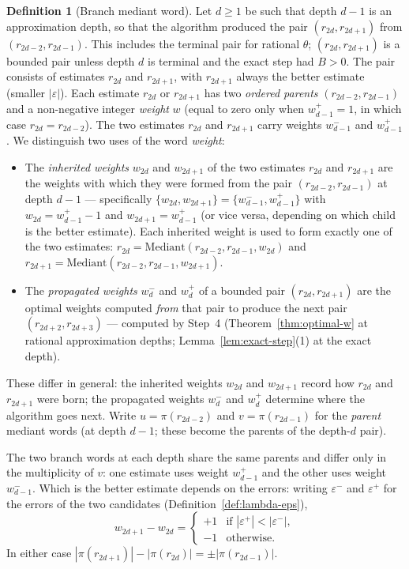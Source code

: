 \documentclass[12pt]{article}
\theoremstyle{definition}
\newtheorem{definition}[theorem]{Definition}
\theoremstyle{remark}
\theoremstyle{plain}
\newcommand{\eps}{\varepsilon}
\newcommand{\epsplus}{\eps^{+}}
\newcommand{\epsminus}{\eps^{-}}
\begin{document}
\begin{definition}[Branch mediant word]
\label{def:parity-sequence}
Let $d \geq 1$ be such that depth $d-1$ is an approximation depth, so that the algorithm produced the
pair $(r_{2d}, r_{2d+1})$ from $(r_{2d-2}, r_{2d-1})$.
This includes the terminal pair for rational $\theta$; $(r_{2d}, r_{2d+1})$ is a bounded
pair unless depth $d$ is terminal and the exact step had $B > 0$.
The pair consists of estimates $r_{2d}$ and $r_{2d+1}$,
with $r_{2d+1}$ always the better estimate (smaller $|\eps|$).
Each estimate $r_{2d}$ or $r_{2d+1}$ has two \emph{ordered parents}
$(r_{2d-2}, r_{2d-1})$ and a non-negative integer \emph{weight} $w$
(equal to zero only when $w^+_{d-1} = 1$, in which case $r_{2d} = r_{2d-2}$).
The two estimates $r_{2d}$ and $r_{2d+1}$ carry weights $w^-_{d-1}$ and $w^+_{d-1}$.
We distinguish two uses of the word \emph{weight}:
\begin{itemize}
  \item The \emph{inherited weights} $w_{2d}$ and $w_{2d+1}$ of the two estimates
        $r_{2d}$ and $r_{2d+1}$ are the weights with which they were formed from
        the pair $(r_{2d-2}, r_{2d-1})$ at depth $d-1$ --- specifically
        $\{w_{2d}, w_{2d+1}\} = \{w^-_{d-1}, w^+_{d-1}\}$ with $w_{2d} = w^+_{d-1} - 1$
        and $w_{2d+1} = w^+_{d-1}$ (or vice versa, depending on which child is the better
        estimate). Each inherited weight is used to form exactly one of the two
        estimates: $r_{2d} = \mathrm{Mediant}(r_{2d-2}, r_{2d-1}, w_{2d})$ and
        $r_{2d+1} = \mathrm{Mediant}(r_{2d-2}, r_{2d-1}, w_{2d+1})$.
  \item The \emph{propagated weights} $w^-_d$ and $w^+_d$ of a bounded pair $(r_{2d}, r_{2d+1})$
        are the optimal weights computed \emph{from} that pair to produce the next
        pair $(r_{2d+2}, r_{2d+3})$ --- computed by Step~4
        (Theorem~\ref{thm:optimal-w} at rational approximation depths; Lemma~\ref{lem:exact-step}(1)
        at the exact depth).
\end{itemize}
These differ in general: the inherited weights $w_{2d}$ and $w_{2d+1}$ record how $r_{2d}$ and $r_{2d+1}$ were born;
the propagated weights $w^-_d$ and $w^+_d$ determine where the algorithm goes next.
Write $u = \pi(r_{2d-2})$ and $v = \pi(r_{2d-1})$ for the \emph{parent} mediant words
(at depth $d-1$; these become the parents of the depth-$d$ pair).

The two branch words at each depth share the same parents and differ only in the
multiplicity of $v$: one estimate uses weight $w^+_{d-1}$ and the other uses weight $w^-_{d-1}$.
Which is the better estimate depends on the errors: writing $\epsminus$ and $\epsplus$ for
the errors of the two candidates (Definition~\ref{def:lambda-eps}),
\[
  w_{2d+1} - w_{2d} = \begin{cases} +1 & \text{if } |\epsplus| < |\epsminus|, \\ -1 & \text{otherwise.}\end{cases}
\]
In either case $|\pi(r_{2d+1})| - |\pi(r_{2d})| = \pm|\pi(r_{2d-1})|$.


\end{definition}
\end{document}
